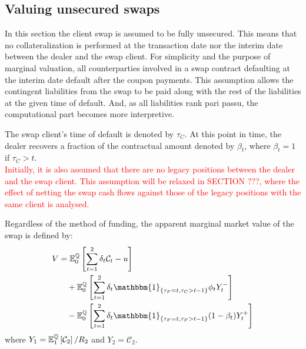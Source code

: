 \documentclass[main.tex]{subfiles}
\begin{document}
    \subsection{Valuing unsecured swaps}
        In this section the client swap is assumed to be fully unsecured.
        This means that no collateralization is performed at the transaction date nor the interim date between the dealer and the swap client.
        For simplicity and the purpose of marginal valuation,
        all counterparties involved in a swap contract defaulting at the interim date default after the coupon payments.
        This assumption allows the contingent liabilities from the swap to be paid along with the rest of the liabilities at the given time of default.
        And, as all liabilities rank pari passu, the computational part becomes more interpretive.

        The swap client's time of default is denoted by $\tau_{C}$.
        At this point in time, the dealer recovers a fraction of the contractual amount denoted by $\beta_{t}$, where $\beta_{t} = 1$ if $\tau_{C}>t$.
        \\
        \textcolor{red}{Initially, it is also assumed that there are no legacy positions between the dealer and the swap client.
        This assumption will be relaxed in SECTION ???, where the effect of netting the swap cash flows against those of the legacy positions with the same client is analysed.}

        Regardless of the method of funding, the apparent marginal market value of the swap is defined by:
        \begin{align}
            V &=
            \mathbb{E}_{0}^{\rnmeasure}\left[
                \sum_{t=1}^{2} \delta_{t} \mathcal{C}_{t} - u
            \right]
            \nonumber
            \\
            &\quad +
            \mathbb{E}_{0}^{\rnmeasure}\left[
                \sum_{t=1}^{2} \delta_{t} \mathbbm{1}_{\{\tau_{F} = t,\tau_{C}>t-1\}} \phi_t Y_{t}^{-} 
            \right]
            \nonumber
            \\
            &\quad -
            \mathbb{E}_{0}^{\rnmeasure}\left[
                \sum_{t=1}^{2} \delta_{t} \mathbbm{1}_{\{\tau_{F} = t,\tau_{F}>t-1\}} (1-\beta_t) Y_{t}^{+} 
            \right]
            \label{eqn:swap-value-multi-period}
        \end{align}
        where $Y_{1} = \mathbb{E}_{1}^{\mathbb{Q}}\left[\mathcal{C}_{2}\right]/R_{2}$ and $Y_{2} = \mathcal{C}_{2}$.
\end{document}
